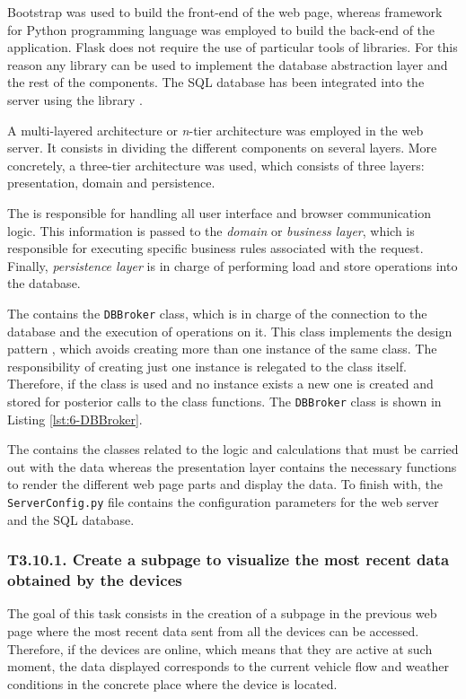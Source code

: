 Bootstrap was used to build the front-end of the web page, whereas  framework \cite{Gri14} for Python programming language was employed to build the back-end of the application. Flask does not require the use of particular tools of libraries. For this reason any library can be used to implement the database abstraction layer and the rest of the components. The SQL database has been integrated into the server using the library  \cite{Mat16}. 

A multi-layered architecture or \textit{n}-tier architecture was employed in the web server. It consists in dividing the different components on several layers. More concretely, a three-tier architecture was used, which consists of three layers: presentation, domain and persistence.

The  is responsible for handling all user interface and browser communication logic. This information is passed to the \textit{domain} or \textit{business layer}, which is responsible for executing specific business rules associated with the request. Finally, \textit{persistence layer} is in charge of performing load and store operations into the database.


The  contains the \texttt{DBBroker} class, which is in charge of the connection to the database and the execution of operations on it. This class implements the  design pattern \cite{Vil07}, which avoids creating more than one instance of the same class. The responsibility of creating just one instance is relegated to the class itself. Therefore, if the class is used and no instance exists a new one is created and stored for posterior calls to the class functions. The \texttt{DBBroker} class is shown in Listing \ref{lst:6-DBBroker}.

The  contains the classes related to the logic and calculations that must be carried out with the data whereas the presentation layer contains the necessary functions to render the different web page parts and display the data. To finish with, the \texttt{ServerConfig.py} file contains the configuration parameters for the web server and the SQL database.




\subsubsection{T3.10.1. Create a subpage to visualize the most recent data obtained by the devices}
The goal of this task consists in the creation of a subpage in the previous web page where the most recent data sent from all the devices can be accessed. Therefore, if the devices are online, which means that they are active at such moment, the data displayed corresponds to the current vehicle flow and weather conditions in the concrete place where the device is located.

